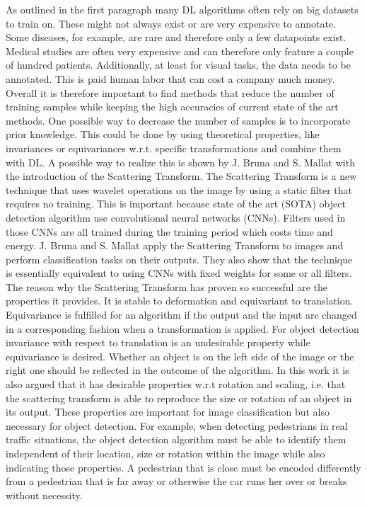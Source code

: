 As outlined in the first paragraph many DL algorithms often rely on big datasets to train on. These might not always exist or are very expensive to annotate. Some diseases, for example, are rare and therefore only a few datapoints exist. Medical studies are often very expensive and can therefore only feature a couple of hundred patients. Additionally, at least for visual tasks, the data needs to be annotated. This is paid human labor that can cost a company much money. Overall it is therefore important to find methods that reduce the number of training samples while keeping the high accuracies of current state of the art methods. 
One possible way to decrease the number of samples is to incorporate prior knowledge. This could be done by using theoretical properties, like invariances or equivariances w.r.t. specific transformations and combine them with DL. 
A possible way to realize this is shown by J. Bruna and
S. Mallat \cite{scatteringTransform2012} with the introduction of the Scattering Transform. The Scattering Transform is a new technique that uses wavelet operations on the image by using a static filter that requires no training. This is important because state of the art (SOTA) object detection algorithm use convolutional neural networks (CNNs). Filters used in those CNNs are all trained during the training period which costs time and energy.
J. Bruna and S. Mallat \cite{scatteringTransform2012} apply the Scattering Transform to images and perform classification tasks on their outputs. They also show that the technique is essentially equivalent to using CNNs with fixed weights for some or all filters. 
The reason why the Scattering Transform has proven so successful are the properties it provides. It is stable to deformation and equivariant to translation. Equivariance is fulfilled for an algorithm if the output and the input are changed in a corresponding fashion when a transformation is applied. For object detection invariance with respect to translation is an undesirable property while equivariance is desired. Whether an object is on the left side of the image or the right one should be reflected in the outcome of the algorithm.  In this work it is also argued that it has desirable properties w.r.t rotation and scaling, i.e. that the scattering transform is able to reproduce the size or rotation of an object in its output. These properties are important for image classification but also necessary for object detection. For example, when detecting pedestrians in real traffic situations, the object detection algorithm must be able to identify them independent of their location, size or rotation within the image while also indicating those properties. A pedestrian that is close must be encoded differently from a pedestrian that is far away or otherwise the car runs her over or breaks without necessity. \\
